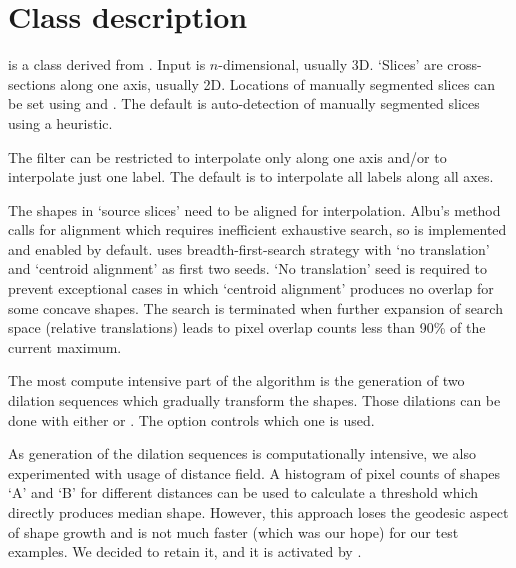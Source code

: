\documentclass{InsightArticle}
\begin{document}
\section{Class description}

 is a class derived from
.
Input is $n$-dimensional, usually 3D.
`Slices' are cross-sections along one axis, usually 2D.
Locations of manually segmented slices can be set using
 and .
The default is auto-detection of manually segmented slices using a heuristic.

The filter can be restricted to interpolate only along one axis
and/or to interpolate just one label.
The default is to interpolate all labels along all axes.

The shapes in `source slices' need to be aligned for interpolation.
Albu's method~\cite{Albu2008} calls for alignment
which requires inefficient exhaustive search,
so  is implemented and enabled by default.
 uses breadth-first-search strategy
with `no translation' and `centroid alignment' as first two seeds.
`No translation' seed is required to prevent exceptional cases in which
`centroid alignment' produces no overlap for some concave shapes.
The search is terminated when further expansion of search space
(relative translations) leads to pixel overlap counts
less than 90\% of the current maximum.

The most compute intensive part of the algorithm
is the generation of two dilation sequences which gradually transform the shapes.
Those dilations can be done with either 
or .
The option  controls which one is used.

As generation of the dilation sequences is computationally intensive,
we also experimented with usage of distance field.
A histogram of pixel counts of shapes `A' and `B' for different distances
can be used to calculate a threshold which directly produces median shape.
However, this approach loses the geodesic aspect of shape growth and
is not much faster (which was our hope) for our test examples.
We decided to retain it, and it is activated by .
\end{document}
